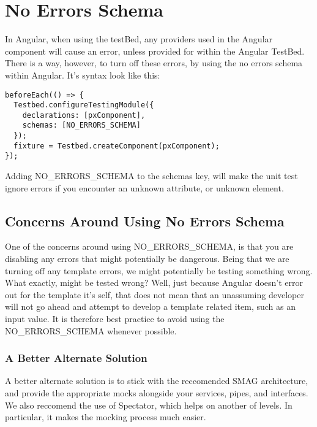 \maketitle{}
\section{ No Errors Schema }

In Angular, when using the testBed, any providers used in the Angular component
will cause an error, unless provided for within the Angular TestBed. There is a
way, however, to turn off these errors, by using the no errors schema within
Angular. It's syntax look like this:
\begin{lstlisting}
beforeEach(() => {
  Testbed.configureTestingModule({
    declarations: [pxComponent],
    schemas: [NO_ERRORS_SCHEMA]
  });
  fixture = Testbed.createComponent(pxComponent);
});
\end{lstlisting}

Adding NO_ERRORS_SCHEMA to the schemas key, will make the unit test ignore
errors if you encounter an unknown attribute, or unknown element.

\subsection{ Concerns Around Using No Errors Schema }
One of the concerns around using NO_ERRORS_SCHEMA, is that you are disabling
any errors that might potentially be dangerous. Being that we are turning off
any template errors, we might potentially be testing something wrong. What
exactly, might be tested wrong? Well, just because Angular doesn't error out
for the template it's self, that does not mean that an unassuming developer
will not go ahead and attempt to develop a template related item, such as an
input value. It is therefore best practice to avoid using the NO_ERRORS_SCHEMA
whenever possible.

\subsubsection{A Better Alternate Solution}
A better alternate solution is to stick with the reccomended SMAG architecture,
and provide the appropriate mocks alongside your services, pipes, and
interfaces. We also reccomend the use of Spectator, which helps on another of
levels. In particular, it makes the mocking process much easier. 
